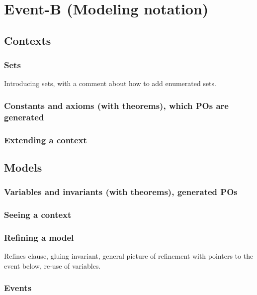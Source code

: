 \section{Event-B (Modeling notation)}
\label{reference_02}

\subsection{Contexts}

\subsubsection{Sets}

Introducing sets, with a comment about how to add enumerated sets.

\subsubsection{Constants and axioms (with theorems), which POs are generated}
   
\subsubsection{Extending a context}

\subsection{Models}

\subsubsection{Variables and invariants (with theorems), generated POs}

\subsubsection{Seeing a context}

\subsubsection{Refining a model}

Refines clause, gluing invariant, general picture of refinement with pointers to the event below, re-use of variables.

\subsubsection{Events}


